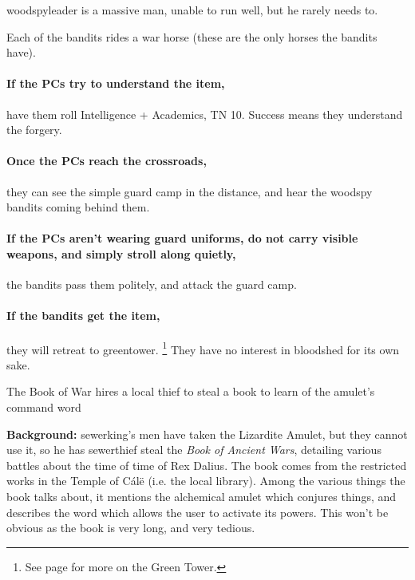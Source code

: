 \begin{multicols}{2}


\woodspyleader

\Gls{woodspyleader} is a massive man, unable to run well, but he rarely needs to.

Each of the bandits rides a war horse (these are the only horses the bandits have).

\paragraph{If the PCs try to understand the item,}
have them roll Intelligence + Academics, TN 10.
Success means they understand the forgery.%

\paragraph{Once the PCs reach the crossroads,}
they can see the simple \gls{guard} camp in the distance, and hear the woodspy bandits coming behind them.

\paragraph{If the PCs aren't wearing \gls{guard} uniforms, do not carry visible weapons, and simply stroll along quietly,}
the bandits pass them politely, and attack the \gls{guard} camp.

\paragraph{If the bandits get the item,} they will retreat to \gls{greentower}.%
\footnote{See page \pageref{green_tower} for more on the Green Tower.}
They have no interest in bloodshed for its own sake.

{The Book of War}%
{ hires a local thief to steal a book to learn of the amulet's command word}%

\textbf{Background:}
\Gls{sewerking}'s men have taken the Lizardite Amulet, but they cannot use it, so he has \gls{sewerthief} steal the \textit{Book of Ancient Wars}, detailing various battles about the time of time of Rex Dalius.%
\iftoggle{aif}{
  \footnote{See Fenestra, page \pageref{h_dalius} for more.}
}{}%
The book comes from the restricted works in the Temple of C\'{a}l\"{e} (i.e. the local library).
Among the various things the book talks about, it mentions the alchemical amulet which conjures things, and describes the word which allows the user to activate its powers.
This won't be obvious as the book is very long, and very tedious.


\end{multicols}
